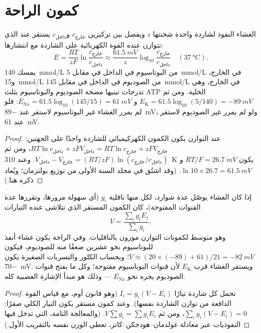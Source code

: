 \section{كمون الراحة}

\begin{theorem}\label{thm:b2:neurons-synapses:nernst}
الغشاء النفوذ لشاردة واحدة شحنتها $z$ ويفصل بين
تركيزين $c_{\text{خارج}}$ و$c_{\text{داخل}}$ يستقر عند
\emph{} الذي تتوازن عنده القوة الكهربائية على
الشاردة مع انتشارها:
\[
E = \frac{RT}{zF}\ln\frac{c_{\text{خارج}}}{c_{\text{داخل}}} \approx \frac{\qty{61.5}{mV}}{z}\log_{10}\frac{c_{\text{خارج}}}{c_{\text{داخل}}} \quad (\qty{37}{\celsius}).
\]
يمسك  \qty{140}{mmol/L} من البوتاسيوم في الداخل في مقابل
\qty{5}{mmol/L} في الخارج، و\qty{15}{mmol/L} من الصوديوم في الداخل
في مقابل \qty{145}{mmol/L} في الخارج، وهي تدرجات تبنيها
مضخة الصوديوم والبوتاسيوم بثلث ATP الخلية.
ومن ثم $E_{\mathrm K} = 61.5\log_{10}(5/140) = \qty{-89}{mV}$ و
$E_{\mathrm{Na}} = 61.5\log_{10}(145/15) = \qty{+61}{mV}$: فلو لم يمرر
الغشاء غير البوتاسيوم لاستقر عند
\qty{-89}{mV}، ولو لم يمرر غير الصوديوم لاستقر عند \qty{+61}{mV}.
\end{theorem}
\begin{proof}
عند التوازن يكون الكمون الكهركيميائي للشاردة واحدًا
على الجهتين: $RT\ln c_{\text{داخل}} + zFV_{\text{داخل}} = RT\ln
c_{\text{خارج}} + zFV_{\text{خارج}}$، ومن ثم $V_{\text{داخل}} -
V_{\text{خارج}} = (RT/zF)\ln(c_{\text{خارج}}/c_{\text{داخل}})$. وعند
\qty{310}{K} يكون $RT/F = \qty{26.7}{mV}$ و$\ln 10 \times 26.7 =
\qty{61.5}{mV}$. (وقد اشتُق في مجلد السنة الأولى من توزيع
بولتزمان؛ ويُعاد ذكره هنا.)
\end{proof}

\begin{theorem}\label{thm:b2:neurons-synapses:chord}
إذا كان الغشاء يوصّل عدة شوارد، لكل منها ناقلية $g_i$
(أي سهولة مرورها، وتقررها عدة القنوات المفتوحة)،
كان الكمون المستقر الذي تتلاشى عنده التيارات
\[
V = \frac{\sum_i g_i E_i}{\sum_i g_i},
\]
وهو متوسط لكمونات التوازن موزون بالناقليات.
وفي الراحة يكون غشاء  أنفذ للبوتاسيوم نحو عشرين ضعفًا
منه للصوديوم، فيكون $V \approx (20\times(-89) +
61)/21 = \qty{-82}{mV}$؛ وبحساب الكلور والتسربات
الصغيرة يكون  \qty{-70}{mV}. ويستقر الغشاء
قرب $E_{\mathrm K}$ لأن قنوات البوتاسيوم مفتوحة؛ وكل ما يفتح
قنوات الصوديوم يجره نحو $E_{\mathrm{Na}}$ --- وذلك
هو مبدأ الإشارة العصبية كله.
\end{theorem}
\begin{proof}
تحمل كل شاردة تيارًا $I_i = g_i(V - E_i)$ (وهو قانون أوم، مع
قياس القوة الدافعة من توازن الشاردة نفسها). وعند
كمون مستقر يكون التيار الكلي صفرًا: $\sum_i g_i(V - E_i) =
0$، ومن ثم $V\sum g_i = \sum g_iE_i$. (والمعالجة التامة، التي
تدخل فيها النفوذيات عبر معادلة غولدمان--هودجكن--كاتز،
تعطي الوزن نفسه بالتقريب الأول.)
\end{proof}


